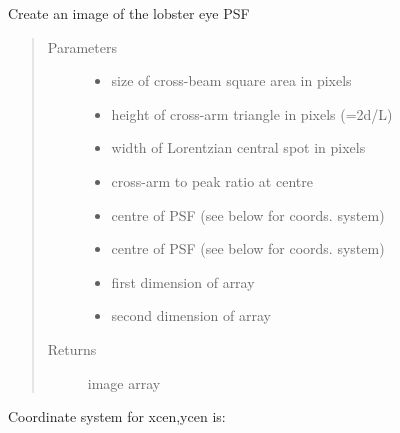 \documentclass[letterpaper,10pt,english]{sphinxmanual}
\begin{document}

\begin{fulllineitems}
\label{\detokenize{images_functions:images.lepsf}}
Create an image of the lobster eye PSF
\begin{quote}\begin{description}
\item[{Parameters}] \leavevmode\begin{itemize}
\item {} 
 \textendash{} size of cross-beam square area in pixels

\item {} 
 \textendash{} height of cross-arm triangle in pixels (=2d/L)

\item {} 
 \textendash{} width of Lorentzian central spot in pixels

\item {} 
 \textendash{} cross-arm to peak ratio at centre

\item {} 
 \textendash{} centre of PSF (see below for coords. system)

\item {} 
 \textendash{} centre of PSF (see below for coords. system)

\item {} 
 \textendash{} first dimension of array

\item {} 
 \textendash{} second dimension of array

\end{itemize}

\item[{Returns}] \leavevmode
image array

\end{description}\end{quote}
\begin{description}
\item[{Coordinate system for xcen,ycen is:}] \leavevmode
{}

\end{description}

\end{fulllineitems}
\end{document}
